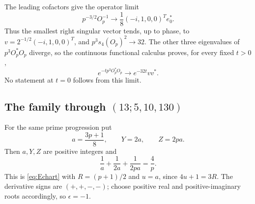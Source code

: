 The leading cofactors give the operator limit
\begin{equation}\label{eq:rankone-limit}
 p^{-3/2}O_p^{-1}
 \longrightarrow\frac18(-i,1,0,0)^Te_0^*.
\end{equation}
Thus the smallest right singular vector tends, up to phase, to
\(v=2^{-1/2}(-i,1,0,0)^T\), and \(p^3s_4(O_p)^2\to32\). The other three
eigenvalues of \(p^3O_p^*O_p\) diverge, so the continuous functional calculus
proves, for every fixed \(t>0\),
\begin{equation}\label{eq:heat-limit}
 e^{-tp^3O_p^*O_p}\longrightarrow e^{-32t}vv^*.
\end{equation}
No statement at \(t=0\) follows from this limit.

\subsection{The family through \((13;5,10,130)\)}

For the same prime progression put
\begin{equation}\label{eq:family2}
 a=\frac{3p+1}{8},\qquad Y=2a,\qquad Z=2pa.
\end{equation}
Then \(a,Y,Z\) are positive integers and
\[
 \frac1a+\frac1{2a}+\frac1{2pa}=\frac4p.
\]
This is \eqref{eq:Echart} with \(R=(p+1)/2\) and \(u=a\), since
\(4u+1=3R\). The derivative signs are
\((+,+,-,-)\); choose positive real and positive-imaginary roots accordingly,
so \(\epsilon=-1\).

